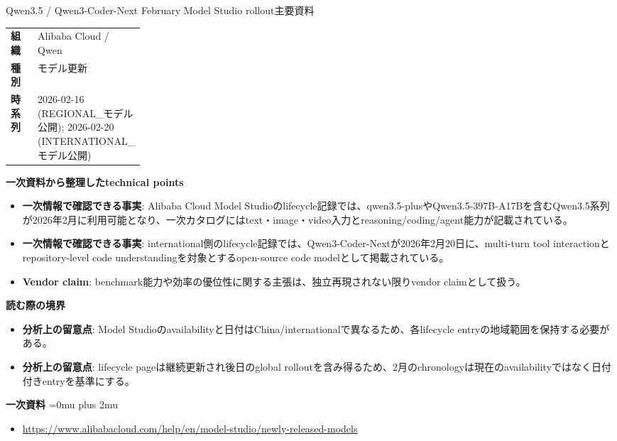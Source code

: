 \begin{technicalnote}{Qwen3.5 / Qwen3-Coder-Next February Model Studio rollout}{主要資料}
\begingroup
\begin{tabularx}{\linewidth}{@{}>{\bfseries}p{0.22\linewidth}X@{}}
組織 & Alibaba Cloud / Qwen \\
種別 & モデル更新 \\
時系列 & 2026-02-16 (REGIONAL\_モデル公開); 2026-02-20 (INTERNATIONAL\_モデル公開) \\
\end{tabularx}
\smallskip
{\bfseries 一次資料から整理したtechnical points}
\begin{itemize}[leftmargin=1.5em,itemsep=0.35em]
\item \textbf{一次情報で確認できる事実}: Alibaba Cloud Model Studioのlifecycle記録では、qwen3.5-plusやQwen3.5-397B-A17Bを含むQwen3.5系列が2026年2月に利用可能となり、一次カタログにはtext・image・video入力とreasoning/coding/agent能力が記載されている。
\item \textbf{一次情報で確認できる事実}: international側のlifecycle記録では、Qwen3-Coder-Nextが2026年2月20日に、multi-turn tool interactionとrepository-level code understandingを対象とするopen-source code modelとして掲載されている。
\item \textbf{Vendor claim}: benchmark能力や効率の優位性に関する主張は、独立再現されない限りvendor claimとして扱う。
\end{itemize}
\begin{minipage}{\linewidth}
{\bfseries 読む際の境界}
\begin{itemize}[leftmargin=1.5em,itemsep=0.35em]
\item \textbf{分析上の留意点}: Model Studioのavailabilityと日付はChina/internationalで異なるため、各lifecycle entryの地域範囲を保持する必要がある。
\item \textbf{分析上の留意点}: lifecycle pageは継続更新され後日のglobal rolloutを含み得るため、2月のchronologyは現在のavailabilityではなく日付付きentryを基準にする。
\end{itemize}
\begin{samepage}
{\bfseries 一次資料}
\begingroup\sloppy
\Urlmuskip=0mu plus 2mu\relax
\begin{itemize}[leftmargin=1.5em,itemsep=0.25em]
\item {\scriptsize\url{https://www.alibabacloud.com/help/en/model-studio/newly-released-models}}
\end{itemize}
\endgroup
\end{samepage}
\end{minipage}
\endgroup
\end{technicalnote}
\medskip

